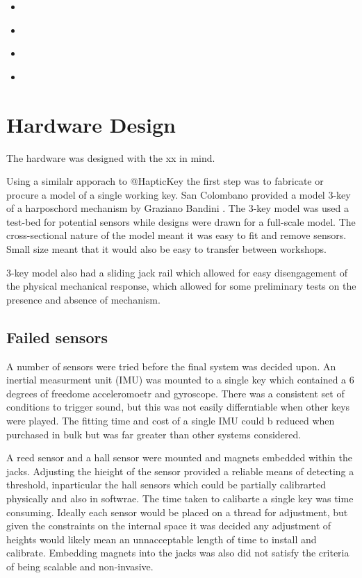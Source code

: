 \begin{itemize}
\tightlist
\item
  \cite{HapticKey}
\item
  \cite{mcPherson1} \cite{mcPherson2}
\item
  \cite{Mudd2013}
\item
  \cite{FritzClaudia2017Leon}
\end{itemize}

\section{Hardware Design}\label{hardware-design}

The hardware was designed with the xx in mind.

Using a similalr apporach to @HapticKey the first step was to fabricate
or procure a model of a single working key. San Colombano provided a
model 3-key of a harposchord mechanism by Graziano Bandini \FIGURE. The
3-key model was used a test-bed for potential sensors while designs were
drawn for a full-scale model. The cross-sectional nature of the model
meant it was easy to fit and remove sensors. Small size meant that it
would also be easy to transfer between workshops.

3-key model also had a sliding jack rail which allowed for easy
disengagement of the physical mechanical response, which allowed for
some preliminary tests on the presence and absence of mechanism.

\subsection{Failed sensors}\label{failed-sensors}

A number of sensors were tried before the final system was decided upon.
An inertial measurment unit (IMU) was mounted to a single key which
contained a 6 degrees of freedome acceleromoetr and gyroscope. There was
a consistent set of conditions to trigger sound, but this was not easily
differntiable when other keys were played. The fitting time and cost of
a single IMU could b reduced when purchased in bulk but was far greater
than other systems considered.

A reed sensor and a hall sensor were mounted and magnets embedded within
the jacks. Adjusting the hieight of the sensor provided a reliable means
of detecting a threshold, inparticular the hall sensors which could be
partially calibrarted physically and also in softwrae. The time taken to
calibarte a single key was time consuming. Ideally each sensor would be
placed on a thread for adjustment, but given the constraints on the
internal space it was decided any adjustment of heights would likely
mean an unnacceptable length of time to install and calibrate. Embedding
magnets into the jacks was also did not satisfy the criteria of being
scalable and non-invasive.

